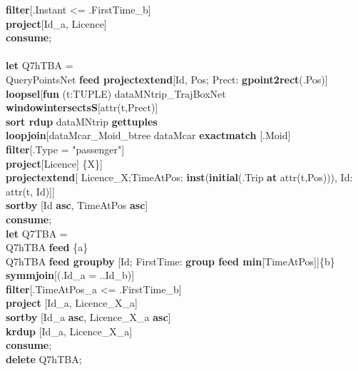 \documentclass[a4paper]{article}
\newcommand{\op}[1]{\textbf{#1}}
\begin{document}
\begin{scriptsize}
\begin{tabbing}
\>\op{filter}[.Instant <= .FirstTime\_b]\\
\>\op{project}[Id\_a, Licence]\\
\op{consume};\\
\\
\op{let} Q7hTBA =\\
\>QueryPointsNet \op{feed projectextend}[Id, Pos; Prect: \op{gpoint2rect}(.Pos)]\\
\>\op{loopsel}[\op{fun} (t:TUPLE) dataMNtrip\_TrajBoxNet \op{windowintersectsS}[attr(t,Prect)]\\
\>\>\>\>\op{sort rdup} dataMNtrip \op{gettuples}\\
\>\>\op{loopjoin}[dataMcar\_Moid\_btree dataMcar \op{exactmatch} [.Moid]\\
\>\>\>\op{filter}[.Type = "passenger"]\\
\>\>\>\op{project}[Licence] \{X\}]\\
\>\>\op{projectextend}[ Licence\_X;TimeAtPos: \op{inst}(\op{initial}(.Trip \op{at} attr(t,Pos))), Id: attr(t, Id)]]\\
\>\op{sortby} [Id \op{asc}, TimeAtPos \op{asc}]\\
\op{consume};\\
\op{let} Q7TBA =\\
\>Q7hTBA \op{feed} \{a\}\\
\>Q7hTBA \op{feed groupby} [Id; FirstTime: \op{group feed min}[TimeAtPos]]\{b\}\\
\>\op{symmjoin}[(.Id\_a = ..Id\_b)]\\
\>\op{filter}[.TimeAtPos\_a <= .FirstTime\_b]\\
\>\op{project} [Id\_a, Licence\_X\_a]\\
\>\op{sortby} [Id\_a \op{asc}, Licence\_X\_a \op{asc}]\\
\>\op{krdup} [Id\_a, Licence\_X\_a]\\
\op{consume};\\
\op{delete} Q7hTBA;\\
\\

\end{tabbing}
\end{scriptsize}
\end{document}
